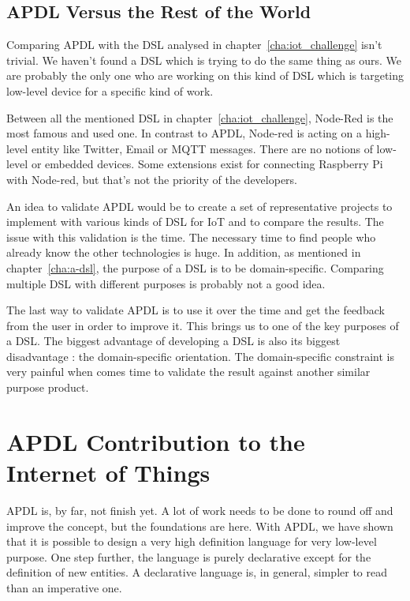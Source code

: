 \subsection{APDL Versus the Rest of the World}
\label{sec:apdl_vs_world}

Comparing \gls{APDL} with the  \gls{DSL} analysed in
chapter~\ref{cha:iot_challenge} isn't trivial. We haven't found a
\gls{DSL} which is trying to do the same thing as ours. We are probably the only
one who are working on this kind of \gls{DSL} which is targeting low-level device for
a specific kind of work.

Between all the mentioned \gls{DSL} in chapter~\ref{cha:iot_challenge},
Node-Red\cite{node-red} is the most famous and used one. In contrast to \gls{APDL},
Node-red is acting on a high-level entity like Twitter, Email or MQTT messages.
There are no notions of low-level or embedded devices. Some extensions exist for
connecting Raspberry Pi with Node-red, but that's not the priority of the developers.

An idea to validate \gls{APDL} would be to create a set of
representative projects to implement with various kinds of \gls{DSL} for
\gls{IoT} and to compare the results. The issue with this validation is the time.
The necessary time to find people who already know the other technologies is
huge. In addition, as mentioned in chapter~\ref{cha:a-dsl}, the purpose of a
\gls{DSL} is to be domain-specific. Comparing multiple \gls{DSL} with different
purposes is probably not a good idea.

The last way to validate \gls{APDL} is to use it over the time and get the
feedback from the user in order to improve it. This brings us to one of the key
purposes of a \gls{DSL}. The biggest advantage of developing a \gls{DSL} is also
its biggest disadvantage : the domain-specific orientation. The domain-specific
constraint is very painful when comes time to validate the result
against another similar purpose product.

\section{APDL Contribution to the Internet of Things}
\label{sec:apdl_contribution}

\gls{APDL} is, by far, not finish yet. A lot of work needs to be done to
round off and improve the concept, but the foundations are here. With \gls{APDL},
we have shown that it is possible to design a very high definition language for
very low-level purpose. One step further, the language is purely declarative
except for the definition of new entities. A declarative language is, in
general, simpler to read than an imperative one.

